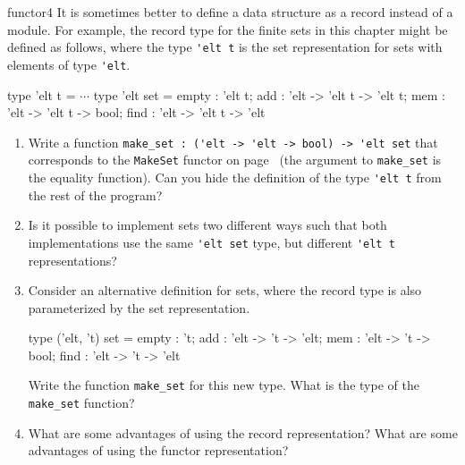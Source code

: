 %
%
\begin{exercise}{functor4}
It is sometimes better to define a data structure as a record instead
of a module.  For example, the record type for the finite sets in this
chapter might be defined as follows, where the
type \hbox{\lstinline$'elt t$} is the set representation for sets with
elements of type \hbox{\lstinline$'elt$}.

\begin{ocaml}
type 'elt t = $\cdots$
type 'elt set =
   { empty : 'elt t;
     add   : 'elt -> 'elt t -> 'elt t;
     mem   : 'elt -> 'elt t -> bool;
     find  : 'elt -> 'elt t -> 'elt
   }
\end{ocaml}
%
\begin{enumerate}
\item

Write a function
%
\hbox{\lstinline$make_set : ('elt -> 'elt -> bool) -> 'elt set$}
%
that corresponds to the \hbox{\lstinline$MakeSet$} functor on
page~\pageref{page:mset1} (the argument to \hbox{\lstinline$make_set$}
is the equality function).  Can you hide the definition of the type
%
\hbox{\lstinline$'elt t$}
%
from the rest of the program?

\item

Is it possible to implement sets two different ways such that both
implementations use the same \hbox{\lstinline$'elt set$} type, but
different \hbox{\lstinline$'elt t$} representations?

\item

Consider an alternative definition for sets, where the record type is
also parameterized by the set representation.

\begin{ocaml}
type ('elt, 't) set =
   { empty : 't;
     add   : 'elt -> 't -> 'elt;
     mem   : 'elt -> 't -> bool;
     find  : 'elt -> 't -> 'elt
   }
\end{ocaml}
%
Write the function \hbox{\lstinline$make_set$} for this new type.  What is
the type of the \hbox{\lstinline$make_set$} function?

\item

What are some advantages of using the record representation?  What are
some advantages of using the functor representation?
\end{enumerate}


\end{exercise}
